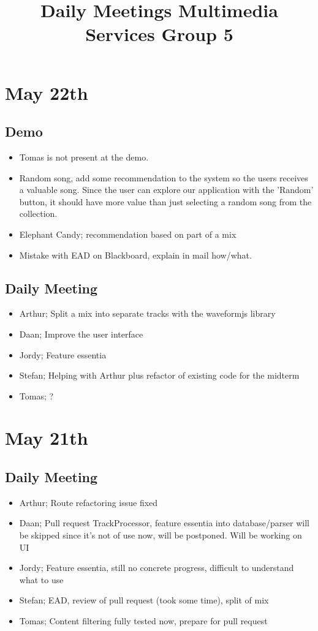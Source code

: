 \documentclass[]{article}
\begin{document}
\title{Daily Meetings Multimedia Services Group 5}
\maketitle

\section*{May 22th}

\subsection*{Demo}
\begin{itemize}
	\item	Tomas is not present at the demo. 
	\item Random song, add some recommendation to the system so the users receives a valuable song. Since the user can explore our application with the 'Random' button, it should have more value than just selecting a random song from the collection.
	\item Elephant Candy; recommendation based on part of a mix
	\item Mistake with EAD on Blackboard, explain in mail how/what.
\end{itemize}

\subsection*{Daily Meeting}
\begin{itemize}
	\item Arthur; Split a mix into separate tracks with the waveformjs library
	\item Daan; Improve the user interface
	\item Jordy; Feature essentia
	\item Stefan; Helping with Arthur plus refactor of existing code for the midterm
	\item Tomas; ?
\end{itemize}

\section*{May 21th}
\subsection*{Daily Meeting}
\begin{itemize}
	\item Arthur; Route refactoring issue fixed
	\item Daan; Pull request TrackProcessor, feature essentia into database/parser will be skipped since it's not of use now, will be postponed. Will be working on UI
	\item Jordy;  Feature essentia, still no concrete progress, difficult to understand what to use
	\item Stefan; EAD, review of pull request (took some time), split of mix
	\item Tomas; Content filtering fully tested now, prepare for pull request
\end{itemize}
\end{document}

